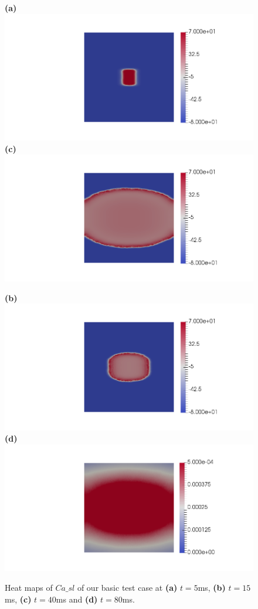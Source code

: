 \documentclass[12pt,a4paper]{article}
\begin{document}
\begin{figure}

\begin{minipage}{0.47\textwidth}
 \textbf{(a)} \includegraphics[trim=9cm 0cm 2cm 0cm, clip=true, width=0.9\linewidth]{v5}
      \textbf{(c)} \includegraphics[trim=9cm 0cm 2cm 0cm, clip=true, width=0.9\linewidth]{v40}
    \end{minipage}
    \begin{minipage}{0.47\textwidth}
  \textbf{(b)} \includegraphics[trim=9cm 0cm 2cm 0cm, clip=true, width=0.9\linewidth]{v15}
  \textbf{(d)} \includegraphics[trim=9cm 0cm 2cm 0cm, clip=true, width=0.9\linewidth]{Casl80}
    \end{minipage}
    \caption{Heat maps of $Ca\_sl$ of our basic test case at \textbf{(a)} $t=5$ms, \textbf{(b)} $t=15$ms, \textbf{(c)} $t=40$ms and \textbf{(d)} $t=80$ms.}
    \label{fig:2}
\end{figure}
\end{document}
